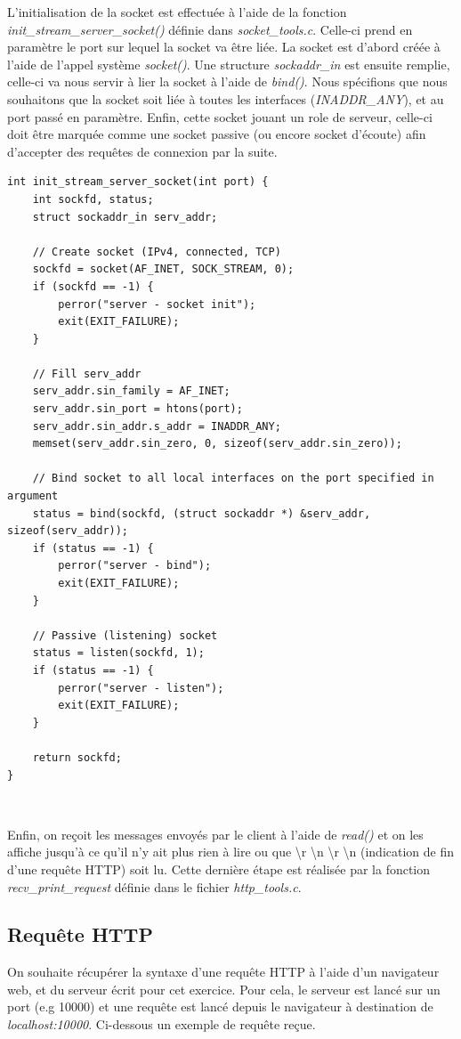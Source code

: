 L'initialisation de la socket est effectuée à l'aide de la fonction \emph{init\_stream\_server\_socket()} définie dans \emph{socket\_tools.c}. Celle-ci prend en paramètre le port sur lequel la socket va être liée. La socket est d'abord créée à l'aide de l'appel système \emph{socket()}. Une structure \emph{sockaddr\_in} est ensuite remplie, celle-ci va nous servir à lier la socket à l'aide de \emph{bind()}. Nous spécifions que nous souhaitons que la socket soit liée à toutes les interfaces (\emph{INADDR\_ANY}), et au port passé en paramètre. Enfin, cette socket jouant un role de serveur, celle-ci doit être marquée comme une socket passive (ou encore socket d'écoute) afin d'accepter des requêtes de connexion par la suite.\\

\begin{lstlisting}
int init_stream_server_socket(int port) {
    int sockfd, status;
    struct sockaddr_in serv_addr;

    // Create socket (IPv4, connected, TCP)
    sockfd = socket(AF_INET, SOCK_STREAM, 0);
    if (sockfd == -1) {
        perror("server - socket init");
        exit(EXIT_FAILURE);
    }

    // Fill serv_addr
    serv_addr.sin_family = AF_INET;
    serv_addr.sin_port = htons(port);
    serv_addr.sin_addr.s_addr = INADDR_ANY;
    memset(serv_addr.sin_zero, 0, sizeof(serv_addr.sin_zero));

    // Bind socket to all local interfaces on the port specified in argument
    status = bind(sockfd, (struct sockaddr *) &serv_addr, sizeof(serv_addr));
    if (status == -1) {
        perror("server - bind");
        exit(EXIT_FAILURE);
    }

    // Passive (listening) socket
    status = listen(sockfd, 1);
    if (status == -1) {
        perror("server - listen");
        exit(EXIT_FAILURE);
    }

    return sockfd;
}
\end{lstlisting}
\

Enfin, on reçoit les messages envoyés par le client à l'aide de \emph{read()} et on les affiche jusqu'à ce qu'il n'y ait plus rien à lire ou que {\textbackslash r \textbackslash n \textbackslash r \textbackslash n} (indication de fin d'une requête HTTP) soit lu. Cette dernière étape est réalisée par la fonction \emph{recv\_print\_request} définie dans le fichier \emph{http\_tools.c}.

\subsection{Requête HTTP}
On souhaite récupérer la syntaxe d'une requête HTTP à l'aide d'un navigateur web, et du serveur écrit pour cet exercice. Pour cela, le serveur est lancé sur un port (e.g 10000) et une requête est lancé depuis le navigateur à destination de \emph{localhost:10000}. Ci-dessous un exemple de requête reçue.

